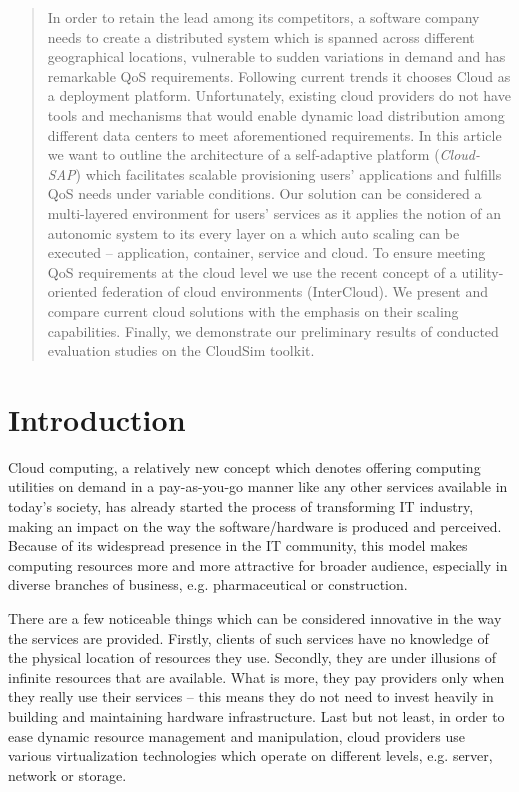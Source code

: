 \documentclass[twocolumn]{svjour3}          %
\begin{document}
\begin{abstract}
In order to retain the lead among its competitors, a software company needs to create a distributed system which is spanned across different geographical locations, vulnerable to sudden variations in demand and has remarkable QoS requirements. Following current trends it chooses Cloud as a deployment platform. Unfortunately, existing cloud providers do not have tools and mechanisms that would enable dynamic load distribution among different data centers to meet aforementioned requirements.
In this article we want to outline the architecture of a self-adaptive platform (\emph{Cloud-SAP}) which facilitates scalable provisioning users' applications and fulfills QoS needs under variable conditions. Our solution can be considered a multi-layered environment for users' services as it applies the notion of an autonomic system to its every layer on a which auto scaling can be executed -- application, container, service and cloud. To ensure meeting QoS requirements at the cloud level we use the recent concept of a utility-oriented federation of cloud environments (InterCloud).
We present and compare current cloud solutions with the emphasis on their scaling capabilities. Finally, we demonstrate our preliminary results of conducted evaluation studies on the CloudSim toolkit. 

\end{abstract}

\section{Introduction}
\label{intro}
Cloud computing, a relatively new concept which denotes offering computing utilities on demand in a pay-as-you-go manner like any other services available in today's society, has already started the process of transforming IT industry, making an impact on the way the software/hardware is produced and perceived. Because of its widespread presence in the IT community, this model makes computing resources more and more attractive for broader audience, especially in diverse branches of business, e.g. pharmaceutical or construction.

There are a few noticeable things which can be considered innovative in the way the services are provided. Firstly, clients of such services have no knowledge of the physical location of resources they use. Secondly, they are under illusions of infinite resources that are available. What is more, they pay providers only when they really use their services -- this means they do not need to invest heavily in building and maintaining hardware infrastructure. Last but not least, in order to ease dynamic resource management and manipulation, cloud providers use various virtualization technologies which operate on different levels, e.g. server, network or storage.
\end{document}
